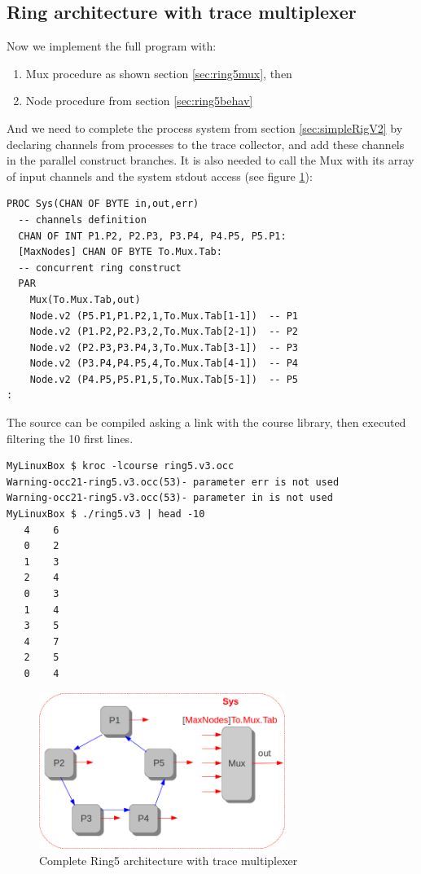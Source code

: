 \documentclass[times,a4paper]{book}
\begin{document}
\subsection {Ring architecture with trace multiplexer }
\label{sec:ringArchiv3}

Now we implement the full program with:
\begin{enumerate}
\item Mux procedure as shown section \ref{sec:ring5mux}, then
\item Node procedure from section \ref{sec:ring5behav}
\end{enumerate}

And we need to complete the process system from section \ref{sec:simpleRigV2} by declaring channels from processes to the trace collector,
and add these channels in the parallel construct branches. It is also needed to call the Mux with
its array of input channels and the system stdout access (see figure 
\ref{fig:mux3}):


\begin{lstlisting}  
PROC Sys(CHAN OF BYTE in,out,err)
  -- channels definition
  CHAN OF INT P1.P2, P2.P3, P3.P4, P4.P5, P5.P1:
  [MaxNodes] CHAN OF BYTE To.Mux.Tab:
  -- concurrent ring construct
  PAR
    Mux(To.Mux.Tab,out)
    Node.v2 (P5.P1,P1.P2,1,To.Mux.Tab[1-1])  -- P1
    Node.v2 (P1.P2,P2.P3,2,To.Mux.Tab[2-1])  -- P2
    Node.v2 (P2.P3,P3.P4,3,To.Mux.Tab[3-1])  -- P3
    Node.v2 (P3.P4,P4.P5,4,To.Mux.Tab[4-1])  -- P4
    Node.v2 (P4.P5,P5.P1,5,To.Mux.Tab[5-1])  -- P5
:
\end{lstlisting} 

The source can be compiled asking a link with the course library, 
then executed filtering the 10 first lines.
 
\begin{lstlisting} 
MyLinuxBox $ kroc -lcourse ring5.v3.occ
Warning-occ21-ring5.v3.occ(53)- parameter err is not used
Warning-occ21-ring5.v3.occ(53)- parameter in is not used
MyLinuxBox $ ./ring5.v3 | head -10
   4    6
   0    2
   1    3
   2    4
   0    3
   1    4
   3    5
   4    7
   2    5
   0    4
\end{lstlisting} 


\begin{figure}[hbtp]
\begin{center} 
\includegraphics[width=8cm]{mux3.png}
\caption{Complete Ring5 architecture with trace multiplexer
}
\label{fig:mux3}
\end{center}
\end{figure}
\end{document}
